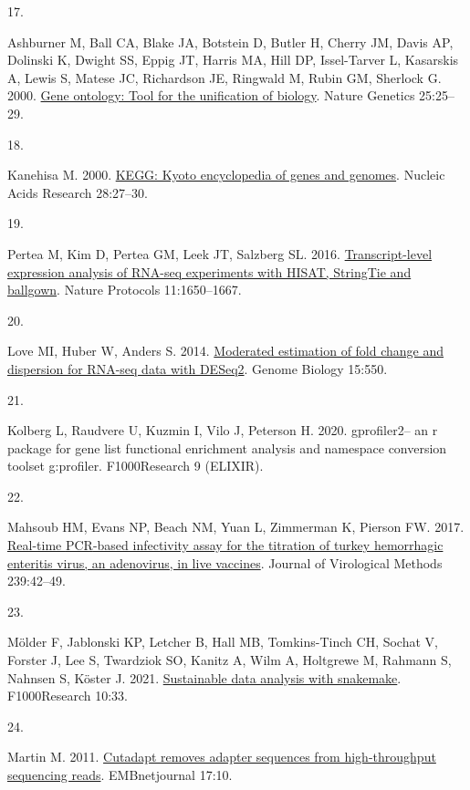 \documentclass[
]{article}
\newlength{\cslhangindent}
\newlength{\csllabelwidth}
\newenvironment{CSLReferences}[2] %
 {\begin{list}{}{%
  \setlength{\itemindent}{0pt}
  \setlength{\leftmargin}{0pt}
  \setlength{\parsep}{0pt}
  \ifodd #1
   \setlength{\leftmargin}{\cslhangindent}
   \setlength{\itemindent}{-1\cslhangindent}
  \fi
  \setlength{\itemsep}{#2\baselineskip}}}
 {\end{list}}
\newcommand{\CSLLeftMargin}[1]{\parbox[t]{\csllabelwidth}{\strut#1\strut}}
\newcommand{\CSLRightInline}[1]{\parbox[t]{\linewidth - \csllabelwidth}{\strut#1\strut}}
\begin{document}
\begin{CSLReferences}{0}{1}
\CSLLeftMargin{17. }%
\CSLRightInline{Ashburner M, Ball CA, Blake JA, Botstein D, Butler H,
Cherry JM, Davis AP, Dolinski K, Dwight SS, Eppig JT, Harris MA, Hill
DP, Issel-Tarver L, Kasarskis A, Lewis S, Matese JC, Richardson JE,
Ringwald M, Rubin GM, Sherlock G. 2000.
\href{https://doi.org/10.1038/75556}{Gene ontology: Tool for the
unification of biology}. Nature Genetics 25:25--29.}

\CSLLeftMargin{18. }%
\CSLRightInline{Kanehisa M. 2000.
\href{https://doi.org/10.1093/nar/28.1.27}{KEGG: Kyoto encyclopedia of
genes and genomes}. Nucleic Acids Research 28:27--30.}

\CSLLeftMargin{19. }%
\CSLRightInline{Pertea M, Kim D, Pertea GM, Leek JT, Salzberg SL. 2016.
\href{https://doi.org/10.1038/nprot.2016.095}{Transcript-level
expression analysis of RNA-seq experiments with HISAT, StringTie and
ballgown}. Nature Protocols 11:1650--1667.}

\CSLLeftMargin{20. }%
\CSLRightInline{Love MI, Huber W, Anders S. 2014.
\href{https://doi.org/10.1186/s13059-014-0550-8}{Moderated estimation of
fold change and dispersion for RNA-seq data with DESeq2}. Genome Biology
15:550.}

\CSLLeftMargin{21. }%
\CSLRightInline{Kolberg L, Raudvere U, Kuzmin I, Vilo J, Peterson H.
2020. gprofiler2-- an r package for gene list functional enrichment
analysis and namespace conversion toolset g:profiler. F1000Research 9
(ELIXIR).}

\CSLLeftMargin{22. }%
\CSLRightInline{Mahsoub HM, Evans NP, Beach NM, Yuan L, Zimmerman K,
Pierson FW. 2017.
\href{https://doi.org/10.1016/j.jviromet.2016.11.002}{Real-time
{PCR}-based infectivity assay for the titration of turkey hemorrhagic
enteritis virus, an adenovirus, in live vaccines}. Journal of
Virological Methods 239:42--49.}

\CSLLeftMargin{23. }%
\CSLRightInline{Mölder F, Jablonski KP, Letcher B, Hall MB,
Tomkins-Tinch CH, Sochat V, Forster J, Lee S, Twardziok SO, Kanitz A,
Wilm A, Holtgrewe M, Rahmann S, Nahnsen S, Köster J. 2021.
\href{https://doi.org/10.12688/f1000research.29032.2}{Sustainable data
analysis with snakemake}. F1000Research 10:33.}

\CSLLeftMargin{24. }%
\CSLRightInline{Martin M. 2011.
\href{https://doi.org/10.14806/ej.17.1.200}{Cutadapt removes adapter
sequences from high-throughput sequencing reads}. EMBnetjournal 17:10.}


\end{CSLReferences}
\end{document}
